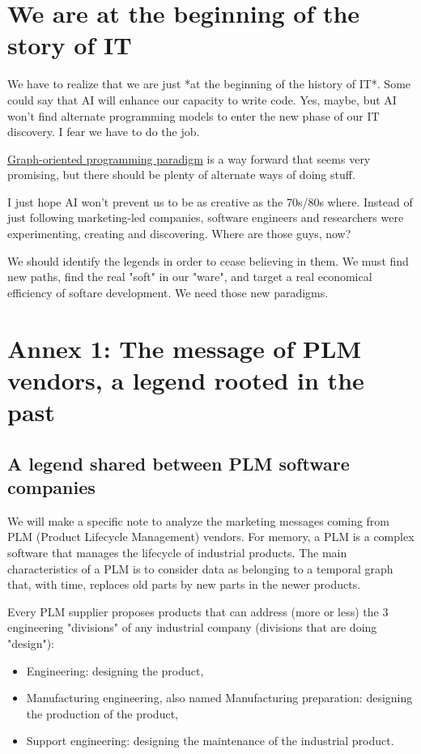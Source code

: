 \documentclass[]{article}
\begin{document}
\section{We are at the beginning of the story of IT}

We have to realize that we are just *at the beginning of the history of IT*. Some could say that AI will enhance our capacity to write code. Yes, maybe, but AI won't find alternate programming models to enter the new phase of our IT discovery. I fear we have to do the job.

\href{https://orey.github.io/papers/pdf/20161026-TheGraphOrientedProgrammingParadigm-ORey-PreliminaryVersion.pdf}{Graph-oriented programming paradigm} is a way forward that seems very promising, but there should be plenty of alternate ways of doing stuff.

I just hope AI won't prevent us to be as creative as the 70s/80s where. Instead of just following marketing-led companies, software engineers and researchers were experimenting, creating and discovering. Where are those guys, now?

We should identify the legends in order to cease believing in them. We must find new paths, find the real "soft" in our "ware", and target a real economical efficiency of softare development. We need those new paradigms.

\section{Annex 1: The message of PLM vendors, a legend rooted in the past}

\subsection{A legend shared between PLM software companies}
\label{plm-vendors}

We will make a specific note to analyze the marketing messages coming from PLM (Product Lifecycle Management) vendors. For memory, a PLM is a complex software that manages the lifecycle of industrial products. The main characteristics of a PLM is to consider data as belonging to a temporal graph that, with time, replaces old parts by new parts in the newer products.

Every PLM supplier proposes products that can address (more or less) the 3 engineering "divisions" of any industrial company (divisions that are doing "design"):

\begin{itemize}
\item Engineering: designing the product,
\item Manufacturing engineering, also named Manufacturing preparation: designing the production of the product,
\item Support engineering: designing the maintenance of the industrial product.
\end{itemize}
\end{document}
